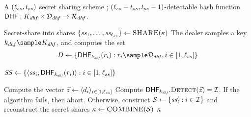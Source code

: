 
\begin{algorithm}
\caption{$\detectableSecretSharingScheme = \langle \DSShare, \DSCombine \rangle$ \label{protocol:dss}}
\footnotesize
\begin{algorithmic}[1]

\Require A $(\ell_{ss}, t_{ss})$ secret sharing scheme \secretSharingSchemeDefn; $(\ell_{ss} - t_{ss}, t_{ss} - 1)$-detectable hash function $\dhf: \dhfKeySpace \times \dhfDomain \rightarrow \dhfRange$.

\Statex{}
\Procedure{\DSShare}{$\genericSymmKey$}   
\State Secret-share \genericSymmKey into \secretShareLength shares $\{ \mathit{ss}_{1}, \dots, \mathit{ss}_{\ell_{ss}} \} \gets \textsc{SHARE}(\kappa)$
\State The dealer samples a key $\dhfKey \sample \dhfKeySpace$, and computes the set 
\[
\dhfSet \assign \{ \dhf[\dhfKey](\genericRand[\setIdx]): \genericRand[\setIdx] \sample \dhfDomain, \setIdx \in [1, \secretShareLength] \} 
\]

\State \Return $\ssSet \assign \{ \langle \secretShare{\setIdx}, \dhf[\dhfKey](\genericRand[\setIdx]) \rangle: \setIdx \in [1, \secretShareLength] \}$
\EndProcedure

\Statex{}
\Procedure{\DSCombine}{$\ssSet$} 
\State Compute the vector $\genericVec \assign \langle \dhfSetElmt{\setIdx}\rangle_{\setIdx \in [1, \secretShareLength]}$ 
\State Compute $\dhf[\dhfKey].\dhfDetect(\genericVec) =
    \matchedIndexSet$. If the algorithm fails, then abort. Otherwise, construct $\genericSetVar \assign \{ \secretShare{\setIdx}' :   \setIdx \in \matchedIndexSet \}$ and reconstruct the secret shares $\genericSymmKey \assign \SSCombine(\genericSetVar)$ 
\State \Return $\genericSymmKey$

\EndProcedure
\end{algorithmic}
\end{algorithm}